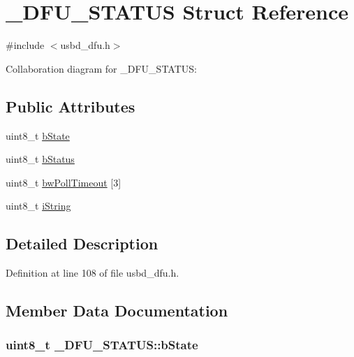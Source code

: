 \hypertarget{struct__DFU__STATUS}{}\section{\+\_\+\+D\+F\+U\+\_\+\+S\+T\+A\+T\+US Struct Reference}
\label{struct__DFU__STATUS}


{\ttfamily \#include $<$usbd\+\_\+dfu.\+h$>$}



Collaboration diagram for \+\_\+\+D\+F\+U\+\_\+\+S\+T\+A\+T\+US\+:
\subsection*{Public Attributes}
\begin{DoxyCompactItemize}
\item 
uint8\+\_\+t \hyperlink{struct__DFU__STATUS_a0beec369f74d37d0e6329e3826e7b1ef}{b\+State}
\item 
uint8\+\_\+t \hyperlink{struct__DFU__STATUS_a119f8cd204d5cac52dc10c5a05847c11}{b\+Status}
\item 
uint8\+\_\+t \hyperlink{struct__DFU__STATUS_acb250abf9daba1a07c7ec98cb0e89bfe}{bw\+Poll\+Timeout} \mbox{[}3\mbox{]}
\item 
uint8\+\_\+t \hyperlink{struct__DFU__STATUS_ab486ff4ce617b2808ec80d0188403aab}{i\+String}
\end{DoxyCompactItemize}


\subsection{Detailed Description}


Definition at line 108 of file usbd\+\_\+dfu.\+h.



\subsection{Member Data Documentation}
\subsubsection[{\texorpdfstring{b\+State}{bState}}]{\setlength{\rightskip}{0pt plus 5cm}uint8\+\_\+t \+\_\+\+D\+F\+U\+\_\+\+S\+T\+A\+T\+U\+S\+::b\+State}\hypertarget{struct__DFU__STATUS_a0beec369f74d37d0e6329e3826e7b1ef}{}\label{struct__DFU__STATUS_a0beec369f74d37d0e6329e3826e7b1ef}


